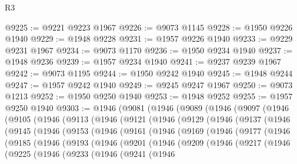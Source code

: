 \begin{lexlean}{R3}
\begin{coremodule}
@9225 := @9221 @9223 @1967
@9226 := @9073 @1145
@9228 := @1950 @9226 @1940
@9229 := @1948 @9228
@9231 := @1957 @9226 @1940
@9233 := @9229 @9231 @1967
@9234 := @9073 @1170
@9236 := @1950 @9234 @1940
@9237 := @1948 @9236
@9239 := @1957 @9234 @1940
@9241 := @9237 @9239 @1967
@9242 := @9073 @1195
@9244 := @1950 @9242 @1940
@9245 := @1948 @9244
@9247 := @1957 @9242 @1940
@9249 := @9245 @9247 @1967
@9250 := @9073 @1213
@9252 := @1950 @9250 @1940
@9253 := @1948 @9252
@9255 := @1957 @9250 @1940
@9303 := @1946
    (@9081
      (@1946
        (@9089
          (@1946
            (@9097
              (@1946
                (@9105
                  (@1946
                    (@9113
                      (@1946
                        (@9121
                          (@1946
                            (@9129
                              (@1946
                                (@9137
                                  (@1946
                                    (@9145
                                      (@1946
                                        (@9153
                                          (@1946
                                            (@9161
                                              (@1946
                                                (@9169
                                                  (@1946
                                                    (@9177
                                                      (@1946
                                                        (@9185
                                                          (@1946
                                                            (@9193
                                                              (@1946
                                                                (@9201
                                                                  (@1946
                                                                    (@9209
                                                                      (@1946
                                                                        (@9217
                                                                          (@1946
                                                                            (@9225
                                                                              (@1946
                                                                                (@9233
                                                                                  (@1946
                                                                                    (@9241
                                                                                      (@1946

\end{coremodule}
\end{lexlean}
